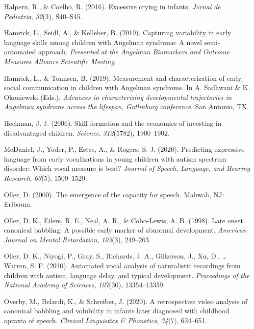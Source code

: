\documentclass[english,,man]{apa6}
\begin{document}
\leavevmode\hypertarget{ref-halpern2016excessive}{}%
Halpern, R., \& Coelho, R. (2016). Excessive crying in infants. \emph{Jornal de Pediatria}, \emph{92}(3), S40--S45.

\leavevmode\hypertarget{ref-hamrick2019capturing}{}%
Hamrick, L., Seidl, A., \& Kelleher, B. (2019). Capturing variability in early language skills among children with Angelman syndrome: A novel semi-automated approach. \emph{Presented at the Angelman Biomarkers and Outcome Measures Alliance Scientific Meeting}.

\leavevmode\hypertarget{ref-hamrick2019measurement}{}%
Hamrick, L., \& Tonnsen, B. (2019). Measurement and characterization of early social communication in children with Angelman syndrome. In A. Sadhwani \& K. Okoniewski (Eds.), \emph{Advances in characterizing developmental trajectories in Angelman syndrome across the lifespan, Gatlinburg conference}. San Antonio, TX.

\leavevmode\hypertarget{ref-heckman2006skill}{}%
Heckman, J. J. (2006). Skill formation and the economics of investing in disadvantaged children. \emph{Science}, \emph{312}(5782), 1900--1902.

\leavevmode\hypertarget{ref-mcdaniel2020predicting}{}%
McDaniel, J., Yoder, P., Estes, A., \& Rogers, S. J. (2020). Predicting expressive language from early vocalizations in young children with autism spectrum disorder: Which vocal measure is best? \emph{Journal of Speech, Language, and Hearing Research}, \emph{63}(5), 1509--1520.

\leavevmode\hypertarget{ref-oller2000emergence}{}%
Oller, D. (2000). The emergence of the capacity for speech. Mahwah, NJ: Erlbaum.

\leavevmode\hypertarget{ref-oller1998late}{}%
Oller, D. K., Eilers, R. E., Neal, A. R., \& Cobo-Lewis, A. B. (1998). Late onset canonical babbling: A possible early marker of abnormal development. \emph{American Journal on Mental Retardation}, \emph{103}(3), 249--263.

\leavevmode\hypertarget{ref-oller2010automated}{}%
Oller, D. K., Niyogi, P., Gray, S., Richards, J. A., Gilkerson, J., Xu, D., \ldots{} Warren, S. F. (2010). Automated vocal analysis of naturalistic recordings from children with autism, language delay, and typical development. \emph{Proceedings of the National Academy of Sciences}, \emph{107}(30), 13354--13359.

\leavevmode\hypertarget{ref-overby2020retrospective}{}%
Overby, M., Belardi, K., \& Schreiber, J. (2020). A retrospective video analysis of canonical babbling and volubility in infants later diagnosed with childhood apraxia of speech. \emph{Clinical Linguistics \& Phonetics}, \emph{34}(7), 634--651.
\end{document}
